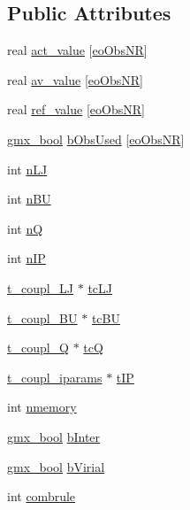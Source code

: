 \subsection*{\-Public \-Attributes}
\begin{DoxyCompactItemize}
\item 
real \hyperlink{structt__coupl__rec_a431fab669b976ddb6bfdc5a8d69748ca}{act\-\_\-value} \mbox{[}\hyperlink{xmdrun_8h_a6a6e9760871cfeaccfb8950c5573d890a0f85237a0d19a3aab67f4e1c16cb8b69}{eo\-Obs\-N\-R}\mbox{]}
\item 
real \hyperlink{structt__coupl__rec_ab66a891fae795a31ae3ed59e0a991f48}{av\-\_\-value} \mbox{[}\hyperlink{xmdrun_8h_a6a6e9760871cfeaccfb8950c5573d890a0f85237a0d19a3aab67f4e1c16cb8b69}{eo\-Obs\-N\-R}\mbox{]}
\item 
real \hyperlink{structt__coupl__rec_a83053e05eab88ba2dedc0a9191851c30}{ref\-\_\-value} \mbox{[}\hyperlink{xmdrun_8h_a6a6e9760871cfeaccfb8950c5573d890a0f85237a0d19a3aab67f4e1c16cb8b69}{eo\-Obs\-N\-R}\mbox{]}
\item 
\hyperlink{include_2types_2simple_8h_a8fddad319f226e856400d190198d5151}{gmx\-\_\-bool} \hyperlink{structt__coupl__rec_a1b3547e413ac43b06dee274022b4f8e1}{b\-Obs\-Used} \mbox{[}\hyperlink{xmdrun_8h_a6a6e9760871cfeaccfb8950c5573d890a0f85237a0d19a3aab67f4e1c16cb8b69}{eo\-Obs\-N\-R}\mbox{]}
\item 
int \hyperlink{structt__coupl__rec_a12ef2735b2f11894fbcd01ec5a6d2d9b}{n\-L\-J}
\item 
int \hyperlink{structt__coupl__rec_a75f29ea9cea9d870e3ac6b0ec59b96e8}{n\-B\-U}
\item 
int \hyperlink{structt__coupl__rec_ab57c425273d04fab5d85e84413894bbf}{n\-Q}
\item 
int \hyperlink{structt__coupl__rec_ad9d77e3afe373b4218c224dd9f4c9802}{n\-I\-P}
\item 
\hyperlink{structt__coupl__LJ}{t\-\_\-coupl\-\_\-\-L\-J} $\ast$ \hyperlink{structt__coupl__rec_a4d4256b979de9c49656b1ca47c560df9}{tc\-L\-J}
\item 
\hyperlink{structt__coupl__BU}{t\-\_\-coupl\-\_\-\-B\-U} $\ast$ \hyperlink{structt__coupl__rec_a5e23a24398c7d3306ad6b457a96ea79a}{tc\-B\-U}
\item 
\hyperlink{structt__coupl__Q}{t\-\_\-coupl\-\_\-\-Q} $\ast$ \hyperlink{structt__coupl__rec_a083e2d88938123594182da616ee73e51}{tc\-Q}
\item 
\hyperlink{structt__coupl__iparams}{t\-\_\-coupl\-\_\-iparams} $\ast$ \hyperlink{structt__coupl__rec_aa19b2bd7792985fc78ea6b3b773c5e34}{t\-I\-P}
\item 
int \hyperlink{structt__coupl__rec_a7c03e305dfda0e4a609cbf3f2dcab656}{nmemory}
\item 
\hyperlink{include_2types_2simple_8h_a8fddad319f226e856400d190198d5151}{gmx\-\_\-bool} \hyperlink{structt__coupl__rec_a0fc3c16fcb081262d131d3ecf19454d4}{b\-Inter}
\item 
\hyperlink{include_2types_2simple_8h_a8fddad319f226e856400d190198d5151}{gmx\-\_\-bool} \hyperlink{structt__coupl__rec_a12b98f0dce82eb94e42860bdb7cce4c9}{b\-Virial}
\item 
int \hyperlink{structt__coupl__rec_a462eee691ee284be46c30cd080ff0b05}{combrule}
\end{DoxyCompactItemize}


